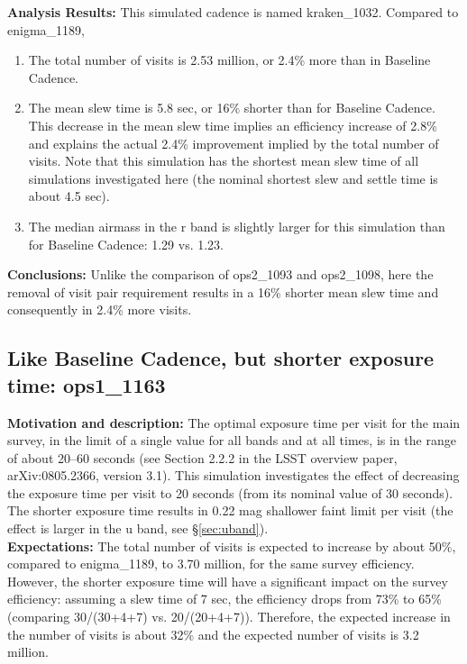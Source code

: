 \documentclass[manuscript]{article}
\begin{document}
{\bf Analysis Results:}  This simulated cadence is named kraken\_1032. Compared
to enigma\_1189,
\begin{enumerate}
\item The total number of visits is 2.53 million, or 2.4\% more than in Baseline Cadence. 
\item 
The mean slew time is 5.8 sec, or 16\% shorter than for Baseline Cadence. This decrease
in the mean slew time implies an efficiency increase of 2.8\% and explains the actual 
2.4\% improvement implied by the total number of visits.  Note that this simulation has 
the shortest mean slew time of all simulations investigated here (the nominal shortest 
slew and settle time is about 4.5 sec). 
\item The median airmass in the r band is slightly larger for this simulation than
for Baseline Cadence: 1.29 vs. 1.23. 
\end{enumerate}


{\bf Conclusions:} 
Unlike the comparison of ops2\_1093 and ops2\_1098, here the removal of visit pair 
requirement results in a 16\% shorter mean slew time and consequently in 2.4\% more visits. 



\subsection{Like Baseline Cadence, but shorter exposure time: ops1\_1163} 


{\bf Motivation and description:} The optimal exposure time per visit for the main survey, 
in the limit of a single value for all bands and at all times, is in the range of about 20--60 seconds
(see Section 2.2.2 in the LSST overview paper, arXiv:0805.2366, version 3.1).
This simulation investigates the effect of decreasing the exposure time per visit to 
20 seconds (from its nominal value of 30 seconds). The shorter exposure time results
in 0.22 mag shallower faint limit per visit (the effect is larger in the u band, see \S\ref{sec:uband}). \\

{\bf Expectations:} The total number of visits is expected to increase by about 50\%,
compared to enigma\_1189, to 3.70 million, for the same survey efficiency. 
However, the shorter exposure time will have a significant impact on 
the survey efficiency: assuming a slew time of 7 sec, the efficiency drops from
73\% to 65\% (comparing 30/(30+4+7) vs. 20/(20+4+7)). Therefore, the expected 
increase in the number of visits is about 32\% and the expected number of visits 
is 3.2 million.  \\
\end{document}
